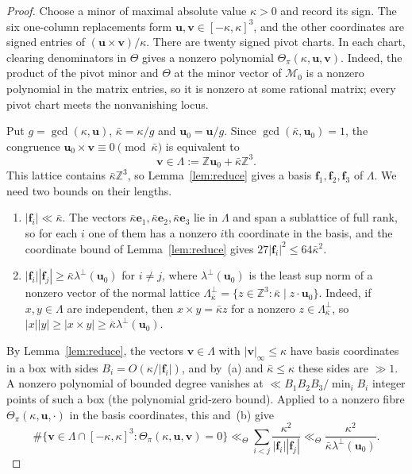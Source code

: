 \documentclass[11pt]{article}
\theoremstyle{definition}
\theoremstyle{remark}
\begin{document}
\begin{proof}
Choose a minor of maximal absolute value $\kappa>0$ and record its sign.
The six one-column replacements form $\mathbf u,\mathbf v\in[-\kappa,\kappa]^3$, and the other
coordinates are signed entries of $(\mathbf u\times \mathbf v)/\kappa$.
There are twenty signed pivot charts. In each chart, clearing denominators
in $\Theta$ gives a nonzero polynomial $\Theta_\pi(\kappa,\mathbf u,\mathbf v)$.
Indeed, the product of the pivot minor and $\Theta$ at the minor vector of $\mathcal M_0$
is a nonzero polynomial in the matrix entries, so it is nonzero at some
rational matrix; every pivot chart meets the nonvanishing locus.

Put $g=\gcd(\kappa,\mathbf u)$, ${\bar\kappa}=\kappa/g$ and $\mathbf u_0=\mathbf u/g$.
Since $\gcd({\bar\kappa},\mathbf u_0)=1$, the congruence $\mathbf u_0\times \mathbf v\equiv0\pmod {\bar\kappa}$
is equivalent to
\[
 \mathbf v\in\Lambda:=\mathbb Z\mathbf u_0+{\bar\kappa}\mathbb Z^3.
\]
This lattice contains ${\bar\kappa}\mathbb Z^3$, so Lemma~\ref{lem:reduce} gives a basis
$\mathbf f_1,\mathbf f_2,\mathbf f_3$ of $\Lambda$. We need two bounds on their lengths.
\begin{enumerate}
\item[(a)] $|\mathbf f_i|\ll {\bar\kappa}$. The vectors ${\bar\kappa}\mathbf e_1,{\bar\kappa}\mathbf e_2,{\bar\kappa}\mathbf e_3$ lie
in $\Lambda$ and span a sublattice of full rank, so for each $i$ one of them
has a nonzero $i$th coordinate in the basis, and the coordinate bound of
Lemma~\ref{lem:reduce} gives $27|\mathbf f_i|^2\le64{\bar\kappa}^2$.
\item[(b)] $|\mathbf f_i||\mathbf f_j|\ge {\bar\kappa}\lambda^\perp(\mathbf u_0)$ for $i\ne j$, where
$\lambda^\perp(\mathbf u_0)$ is the least sup norm of a nonzero vector of the
normal lattice $\Lambda_{\bar\kappa}^\perp=\{z\in\mathbb Z^3:{\bar\kappa}\mid z\cdot\mathbf u_0\}$.
Indeed, if $x,y\in\Lambda$ are independent, then $x\times y={\bar\kappa}z$ for a nonzero
$z\in\Lambda_{\bar\kappa}^\perp$, so $|x||y|\ge|x\times y|\ge {\bar\kappa}\lambda^\perp(\mathbf u_0)$.
\end{enumerate}
By Lemma~\ref{lem:reduce}, the vectors $\mathbf v\in\Lambda$ with
$|\mathbf v|_\infty\le\kappa$ have basis coordinates in a box with sides
$B_i=O(\kappa/|\mathbf f_i|)$, and by~(a) and ${\bar\kappa}\le\kappa$ these sides are $\gg1$. A
nonzero polynomial of bounded degree vanishes at
$\ll B_1B_2B_3/\min_iB_i$ integer points of such a box (the polynomial
grid-zero bound). Applied to a nonzero fibre $\Theta_\pi(\kappa,\mathbf u,\cdot)$
in the basis coordinates, this and~(b) give
\begin{equation}\label{eq:polarfiber}
 \#\{\mathbf v\in\Lambda\cap[-\kappa,\kappa]^3:\Theta_\pi(\kappa,\mathbf u,\mathbf v)=0\}
 \ll_\Theta\sum_{i<j}\frac{\kappa^2}{|\mathbf f_i||\mathbf f_j|}
 \ll_\Theta\frac{\kappa^2}{{\bar\kappa}\lambda^\perp(\mathbf u_0)}.
\end{equation}


\end{proof}
\end{document}
